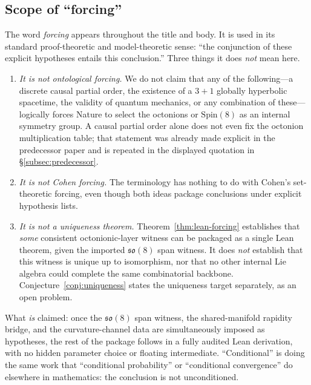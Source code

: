 \documentclass[11pt]{amsart}
\begin{document}
\subsection{Scope of ``forcing''}
\label{subsec:scope-of-forcing}

The word \emph{forcing} appears throughout the title and body. It is used in its standard proof-theoretic and model-theoretic sense: ``the conjunction of these explicit hypotheses entails this conclusion.'' Three things it does \emph{not} mean here.

\begin{enumerate}
  \item \emph{It is not ontological forcing.} We do not claim that any of the following---a discrete causal partial order, the existence of a \(3{+}1\) globally hyperbolic spacetime, the validity of quantum mechanics, or any combination of these---logically forces Nature to select the octonions or \(\mathrm{Spin}(8)\) as an internal symmetry group. A causal partial order alone does not even fix the octonion multiplication table; that statement was already made explicit in the predecessor paper \cite{hqiv-so8-paper} and is repeated in the displayed quotation in \S\ref{subsec:predecessor}.
  \item \emph{It is not Cohen forcing.} The terminology has nothing to do with Cohen's set-theoretic forcing, even though both ideas package conclusions under explicit hypothesis lists.
  \item \emph{It is not a uniqueness theorem.} Theorem~\ref{thm:lean-forcing} establishes that \emph{some} consistent octonionic-layer witness can be packaged as a single Lean theorem, given the imported \(\mathfrak{so}(8)\) span witness. It does \emph{not} establish that this witness is unique up to isomorphism, nor that no other internal Lie algebra could complete the same combinatorial backbone. Conjecture~\ref{conj:uniqueness} states the uniqueness target separately, as an open problem.
\end{enumerate}

\noindent What \emph{is} claimed: once the \(\mathfrak{so}(8)\) span witness, the shared-manifold rapidity bridge, and the curvature-channel data are simultaneously imposed as hypotheses, the rest of the package follows in a fully audited Lean derivation, with no hidden parameter choice or floating intermediate. ``Conditional'' is doing the same work that ``conditional probability'' or ``conditional convergence'' do elsewhere in mathematics: the conclusion is not unconditioned.
\end{document}
